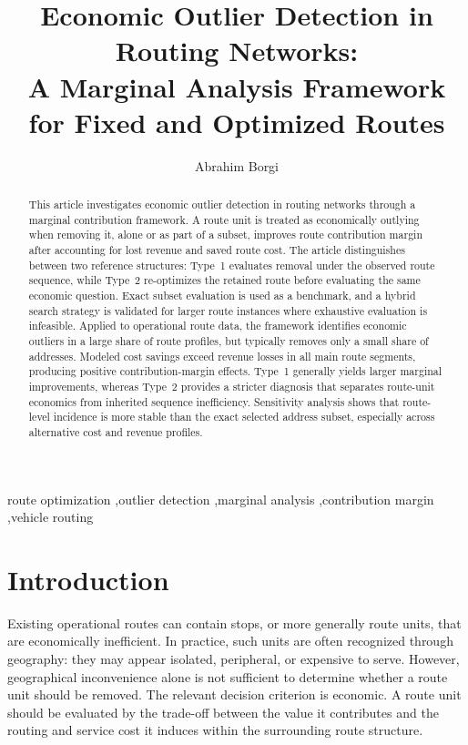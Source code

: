 \documentclass[preprint,12pt]{elsarticle}
\begin{document}
\begin{frontmatter}

\title{Economic Outlier Detection in Routing Networks:\\
A Marginal Analysis Framework for Fixed and Optimized Routes}

\author{Abrahim Borgi}

\begin{abstract}
This article investigates economic outlier detection in routing networks through a marginal contribution framework. A route unit is treated as economically outlying when removing it, alone or as part of a subset, improves route contribution margin after accounting for lost revenue and saved route cost. The article distinguishes between two reference structures: Type~1 evaluates removal under the observed route sequence, while Type~2 re-optimizes the retained route before evaluating the same economic question. Exact subset evaluation is used as a benchmark, and a hybrid search strategy is validated for larger route instances where exhaustive evaluation is infeasible. Applied to operational route data, the framework identifies economic outliers in a large share of route profiles, but typically removes only a small share of addresses. Modeled cost savings exceed revenue losses in all main route segments, producing positive contribution-margin effects. Type~1 generally yields larger marginal improvements, whereas Type~2 provides a stricter diagnosis that separates route-unit economics from inherited sequence inefficiency. Sensitivity analysis shows that route-level incidence is more stable than the exact selected address subset, especially across alternative cost and revenue profiles.
\end{abstract}

\begin{keyword}
route optimization \sep outlier detection \sep marginal analysis \sep contribution margin \sep vehicle routing
\end{keyword}

\end{frontmatter}

\section{Introduction}
\label{sec:introduction}

Existing operational routes can contain stops, or more generally route units, that are economically inefficient. In practice, such units are often recognized through geography: they may appear isolated, peripheral, or expensive to serve. However, geographical inconvenience alone is not sufficient to determine whether a route unit should be removed. The relevant decision criterion is economic. A route unit should be evaluated by the trade-off between the value it contributes and the routing and service cost it induces within the surrounding route structure.
\end{document}
